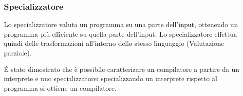 \documentclass[a4paper, 10pt]{report}
\begin{document}
\subsubsection*{Specializzatore}
Lo specializzatore valuta un programma su una parte dell'input, ottenendo un programma più efficiente su quella parte dell'input. Lo specializzatore effettua quindi delle trasformazioni all'interno dello stesso linguaggio (Valutazione parziale).

É stato dimostrato che è possibile caratterizare un compilatore a partire da un interprete e uno specializzatore: specializzando un interprete rispetto al programma si ottiene un compilatore.
\end{document}
